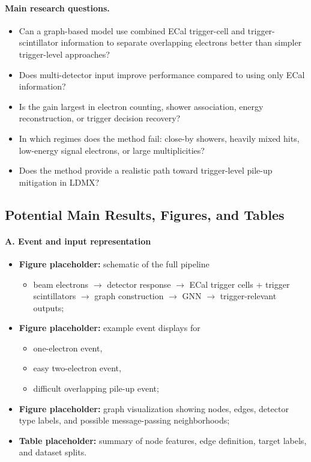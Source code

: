 \paragraph{Main research questions.}
\begin{itemize}
    \item Can a graph-based model use combined ECal trigger-cell and trigger-scintillator information to separate overlapping electrons better than simpler trigger-level approaches?
    \item Does multi-detector input improve performance compared to using only ECal information?
    \item Is the gain largest in electron counting, shower association, energy reconstruction, or trigger decision recovery?
    \item In which regimes does the method fail: close-by showers, heavily mixed hits, low-energy signal electrons, or large multiplicities?
    \item Does the method provide a realistic path toward trigger-level pile-up mitigation in LDMX?
\end{itemize}

\subsection{Potential Main Results, Figures, and Tables}

\paragraph{A. Event and input representation}
\begin{itemize}
    \item \textbf{Figure placeholder:} schematic of the full pipeline
    \begin{itemize}
        \item beam electrons $\rightarrow$ detector response $\rightarrow$ ECal trigger cells + trigger scintillators $\rightarrow$ graph construction $\rightarrow$ GNN $\rightarrow$ trigger-relevant outputs;
    \end{itemize}
    \item \textbf{Figure placeholder:} example event displays for
    \begin{itemize}
        \item one-electron event,
        \item easy two-electron event,
        \item difficult overlapping pile-up event;
    \end{itemize}
    \item \textbf{Figure placeholder:} graph visualization showing nodes, edges, detector type labels, and possible message-passing neighborhoods;
    \item \textbf{Table placeholder:} summary of node features, edge definition, target labels, and dataset splits.
\end{itemize}

